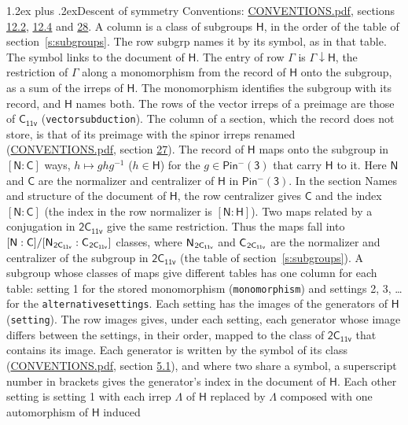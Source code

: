 \documentclass[10pt,a4paper]{article}
\makeatletter
\renewcommand\section{\@startsection{section}{1}{\z@}{-3ex plus -1ex minus -.2ex}%
  {1.2ex plus .2ex}{\normalfont\large\sffamily\bfseries\color{parttitle}}}
\numberwithin{equation}{section}
\newcommand{\grp}[1]{\mathsf{#1}}
\newcommand{\grpindex}[2]{[#1 : #2]}
\newcommand{\restr}[2]{#1\!\downarrow#2}
\newcommand{\hairsp}{\mkern1mu}
\makeatother
\begin{document}
\section{Descent of symmetry}\label{s:subduction}
Conventions: \href{../../CONVENTIONS.pdf}{CONVENTIONS.pdf}, sections \href{../../../rotation/CONVENTIONS.pdf\#conv.12.2}{12.2}, \href{../../../rotation/CONVENTIONS.pdf\#conv.12.4}{12.4} and \href{../../CONVENTIONS.pdf\#conv.28}{28}.
A column is a class of subgroups $\grp{H}$, in the order of the table of section~\ref{s:subgroups}. The row subgrp names it by its symbol, as in that table. The symbol links to the document of $\grp{H}$. The entry of row $\Gamma$ is $\restr{\Gamma}{\grp{H}}$, the restriction of $\Gamma$ along a monomorphism from the record of $\grp{H}$ onto the subgroup, as a sum of the irreps of $\grp{H}$. The monomorphism identifies the subgroup with its record, and $\grp{H}$ names both. The rows of the vector irreps of a preimage are those of \href{../../../rotation/data/pdf/C11v.pdf}{$\grp{C_{11v}}$} (\texttt{vectorsubduction}). The column of a section, which the record does not store, is that of its preimage with the spinor irreps renamed (\href{../../CONVENTIONS.pdf}{CONVENTIONS.pdf}, section \href{../../CONVENTIONS.pdf\#conv.27}{27}). \label{n:group.normalizer.o3}\label{n:group.centralizer.o3}\label{n:element.h}The record of $\grp{H}$ maps onto the subgroup in $\grpindex{\grp{N}}{\grp{C}}$ ways, $h \mapsto g h g^{-1}$ ($h \in \grp{H}$) for the $g \in \grp{Pin^{-}(3)}$ that carry $\grp{H}$ to it. Here $\grp{N}$ and $\grp{C}$ are the normalizer and centralizer of $\grp{H}$ in \href{Pinminus3.pdf}{$\grp{Pin^{-}(3)}$}. In the section Names and structure of the document of $\grp{H}$, the row centralizer gives $\grp{C}$ and the index $\grpindex{\grp{N}}{\grp{C}}$ (the index in the row normalizer is $\grpindex{\grp{N}}{\grp{H}}$). Two maps related by a conjugation in $\grp{2C_{11v}}$ give the same restriction. Thus the maps fall into $\grpindex{\grp{N}}{\grp{C}}/\grpindex{\grp{N}_{\hairsp \grp{2C_{11v}}}}{\grp{C}_{\hairsp \grp{2C_{11v}}}}$ classes, where $\grp{N}_{\hairsp \grp{2C_{11v}}}$ and $\grp{C}_{\hairsp \grp{2C_{11v}}}$ are the normalizer and centralizer of the subgroup in $\grp{2C_{11v}}$ (the table of section~\ref{s:subgroups}). \label{n:head.setting}A subgroup whose classes of maps give different tables has one column for each table: setting 1 for the stored monomorphism (\texttt{monomorphism}) and settings 2, 3, \dots{} for the \texttt{alternativesettings}. Each setting has the images of the generators of $\grp{H}$ (\texttt{setting}). \label{n:head.images}The row images gives, under each setting, each generator whose image differs between the settings, in their order, mapped to the class of $\grp{2C_{11v}}$ that contains its image. Each generator is written by the symbol of its class (\href{../../CONVENTIONS.pdf}{CONVENTIONS.pdf}, section \href{../../../rotation/CONVENTIONS.pdf\#conv.5.1}{5.1}), and where two share a symbol, a superscript number in brackets gives the generator's index in the document of $\grp{H}$. \label{n:irrep.Delta}Each other setting is setting 1 with each irrep $\Lambda$ of $\grp{H}$ replaced by $\Lambda$ composed with one automorphism of $\grp{H}$ induced 
\end{document}

